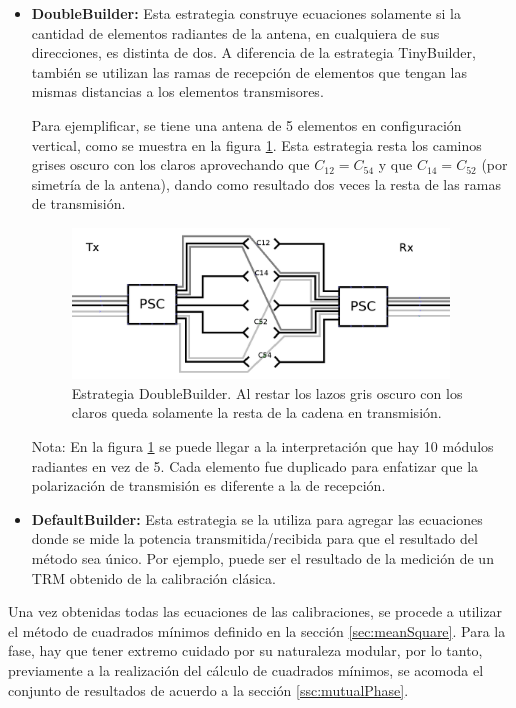 \begin{itemize}
	\item \textbf{DoubleBuilder:} Esta estrategia construye ecuaciones solamente si la cantidad de elementos radiantes de la 
        antena, en cualquiera de sus direcciones, es distinta de dos. A diferencia de la estrategia TinyBuilder, también se 
        utilizan las ramas de recepción de elementos que tengan las mismas distancias a los elementos transmisores.
        
        Para ejemplificar, se tiene una antena de 5 elementos en configuración vertical, como se muestra en la figura 
		\ref{fig:doubleBuilder}. Esta estrategia resta los caminos grises oscuro con los claros aprovechando que
		$C_{12} = C_{54}$ y que $C_{14} = C_{52}$ (por simetría de la antena), dando como resultado dos veces la resta de las
		ramas de transmisión.
		
		\begin{figure}[H]
		 \centering
		 \includegraphics[width=10cm]{gfx/doubleBuilder.png}
		 \caption{Estrategia DoubleBuilder. Al restar los lazos gris oscuro con los claros queda solamente la resta de la cadena
			 en transmisión.}
		 \label{fig:doubleBuilder}
		\end{figure}

        Nota: En la figura \ref{fig:doubleBuilder} se puede llegar a la interpretación que hay 10 módulos radiantes en vez 
        de 5. Cada elemento fue duplicado para enfatizar que la polarización de transmisión es diferente a la de recepción.

	\item \textbf{DefaultBuilder:} Esta estrategia se la utiliza para agregar las ecuaciones donde se mide la potencia 
		transmitida/recibida para que el resultado del método sea único. Por ejemplo, puede ser el resultado de la medición de un 
		TRM obtenido de la calibración clásica.
\end{itemize}

Una vez obtenidas todas las ecuaciones de las calibraciones, se procede a utilizar el método de cuadrados mínimos definido en 
la sección \ref{sec:meanSquare}. Para la fase, hay que tener extremo cuidado por su naturaleza modular, por lo tanto, 
previamente a la realización del cálculo de cuadrados mínimos, se acomoda el conjunto de resultados de acuerdo a la sección 
\ref{ssc:mutualPhase}.


